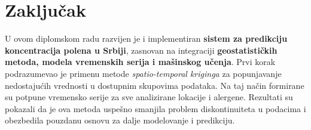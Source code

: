 \documentclass[12pt]{article}
\begin{document}
\begin{table}[h!]
\centering
\caption{RLMSLE vrednosti za predikciju koncentracije jove u Požarevcu po modelima i konfiguracijama meteoroloških podataka.}
\label{tab:rlmsle_jova}
\end{table}



\newpage
\section{Zaključak}

U ovom diplomskom radu razvijen je i implementiran \textbf{sistem za predikciju koncentracija polena u Srbiji}, zasnovan na integraciji \textbf{geostatističkih metoda, modela vremenskih serija i mašinskog učenja}. Prvi korak podrazumevao je primenu metode \textit{spatio-temporal kriginga} za popunjavanje nedostajućih vrednosti u dostupnim skupovima podataka. Na taj način formirane su potpune vremensko serije za sve analizirane lokacije i alergene. Rezultati su pokazali da je ova metoda uspešno smanjila problem diskontinuiteta u podacima i obezbedila pouzdanu osnovu za dalje modelovanje i predikciju.
\end{document}

